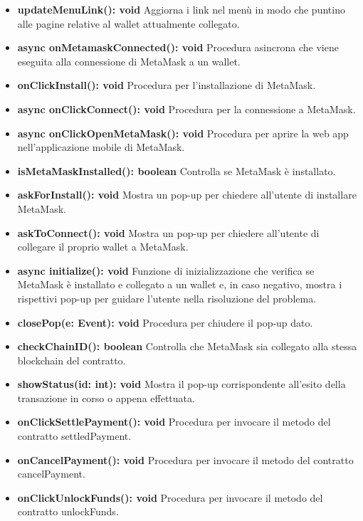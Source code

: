 \documentclass[a4paper, 12pt]{article}
\begin{document}
\begin{itemize}
    \item \textbf{updateMenuLink(): void} Aggiorna i link nel menù in modo che puntino alle pagine relative al wallet attualmente collegato.\\
    \item \textbf{async onMetamaskConnected(): void} Procedura asincrona che viene eseguita alla connessione di MetaMask a un wallet.\\
    \item \textbf{onClickInstall(): void} Procedura per l'installazione di MetaMask.\\
    \item \textbf{async onClickConnect(): void} Procedura per la connessione a MetaMask.\\
    \item \textbf{async onClickOpenMetaMask(): void} Procedura per aprire la web app nell'applicazione mobile di MetaMask.\\
    \item \textbf{isMetaMaskInstalled(): boolean} Controlla se MetaMask è installato.\\
    \item \textbf{askForInstall(): void} Mostra un pop-up per chiedere all'utente di installare MetaMask.\\
    \item \textbf{askToConnect(): void} Mostra un pop-up per chiedere all'utente di collegare il proprio wallet a MetaMask.\\
    \item \textbf{async initialize(): void} Funzione di inizializzazione che verifica se MetaMask è installato e collegato a un wallet e, in caso negativo, mostra i rispettivi pop-up per guidare l'utente nella risoluzione del problema.\\
    \item \textbf{closePop(e: Event): void} Procedura per chiudere il pop-up dato.\\
    \item \textbf{checkChainID(): boolean} Controlla che MetaMask sia collegato alla stessa blockchain del contratto.\\
    \item \textbf{showStatus(id: int): void} Mostra il pop-up corrispondente all'esito della transazione in corso o appena effettuata.\\
    \item \textbf{onClickSettlePayment(): void} Procedura per invocare il metodo del contratto settledPayment.\\
    \item \textbf{onCancelPayment(): void} Procedura per invocare il metodo del contratto cancelPayment.\\
    \item \textbf{onClickUnlockFunds(): void} Procedura per invocare il metodo del contratto unlockFunds.\\
\end{itemize}
\end{document}
